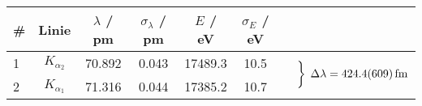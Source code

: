 \begin{tabular}{lcSSSSl}
\toprule
\# & Linie & {$\lambda$ / \si{\pico\metre}} & {$\sigma_{\lambda}$ / \si{\pico\metre}}  & {$E$ / \si{\electronvolt}} & {$\sigma_E$ / \si{\electronvolt}} & \\
	& $K_{\alpha_2}$	& 70.892	& 0.043	& 17489.3	& 10.5 & \\
2	& $K_{\alpha_1}$	& 71.316	& 0.044	& 17385.2	& 10.7 & \\
\bottomrule
\end{tabular}